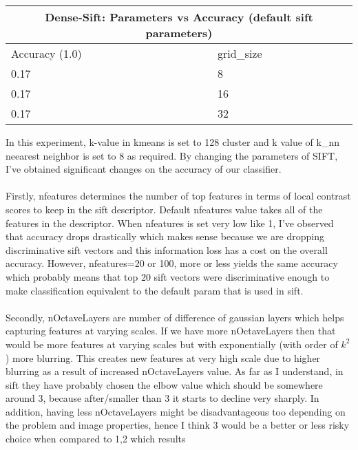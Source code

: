 \documentclass[12pt]{article}
\begin{document}
        \vspace*{0.5cm}
        \begin{tabular}{ |p{1.5cm}||p{3cm}| }
            \hline
            \multicolumn{2}{|c|}{Dense-Sift: Parameters vs Accuracy (default sift parameters)} \\
            \hline
            Accuracy (1.0) & grid\_size \\
            \hline
            0.17 & 8 \\ %
            0.17 & 16 \\ %
            0.17 & 32 \\ %
            \hline
        \end{tabular}


    \begin{center}
        \raggedright
        In this experiment, k-value in kmeans is set to 128 cluster and k value of k\_nn neearest neighbor is set to 8 as required.
        By changing the parameters of SIFT, I've obtained significant changes on the accuracy of our classifier.
        \\~\\
        Firstly, nfeatures determines the number of top features in terms of local contrast scores to keep in the sift descriptor. 
        Default nfeatures value takes all of the features in the descriptor. When nfeatures is set very low like 1, I've observed that accuracy drops drastically
        which makes sense because we are dropping discriminative sift vectors and this information loss has a cost on the overall accuracy.
        However, nfeatures=20 or 100, more or less yields the same accuracy which probably means that top 20 sift vectors were discriminative enough to make 
        classification equivalent to the default param that is used in sift.
        \\~\\
        Secondly, nOctaveLayers are number of difference of gaussian layers which helps capturing features at varying scales.
        If we have more nOctaveLayers then that would be more features at varying scales but with exponentially (with order of $k^{2}$) more blurring.
        This creates new features at very high scale due to higher blurring as a result of increased nOctaveLayers value.
        As far as I understand, in sift they have probably chosen the elbow value which should be somewhere around 3, because after/smaller than 3 it starts to decline very sharply.
        In addition, having less nOctaveLayers might be disadvantageous too depending on the problem and image properties, hence I think 3 would be a better or less risky choice when compared to 1,2 which results

\end{center}
\end{document}
